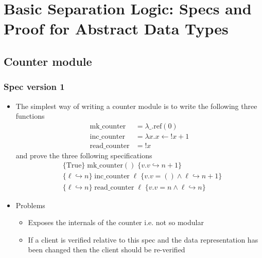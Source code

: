 \section{Basic Separation Logic: Specs and Proof for Abstract Data Types}

\subsection{Counter module}
\subsubsection{Spec version 1}
\begin{itemize}
	\item The simplest way of writing a counter module is to write the following three functions
  \begin{align*}
    \text{mk\_counter} &= \lambda \_.\text{ref}(0) \\
    \text{inc\_counter} &= \lambda x.x \leftarrow !x+1 \\
    \text{read\_counter} &= !x
  \end{align*}
  and prove the three following specifications
  \begin{align*}
    &\{\text{True}\} \; \text{mk\_counter}() \; \{v.v \hookrightarrow n+1\} \\
    &\{\ell \hookrightarrow n\} \; \text{inc\_counter} \; \ell \; \{v.v = () \land \ell \hookrightarrow n+1\} \\
    &\{\ell \hookrightarrow n\} \; \text{read\_counter} \; \ell \; \{v.v = n \land \ell \hookrightarrow n\}
  \end{align*}
  \item Problems
  \begin{itemize}
    \item Exposes the internals of the counter i.e. not so modular
    \item If a client is verified relative to this spec and the data representation has been changed then the client should be re-verified
  \end{itemize}
\end{itemize}

